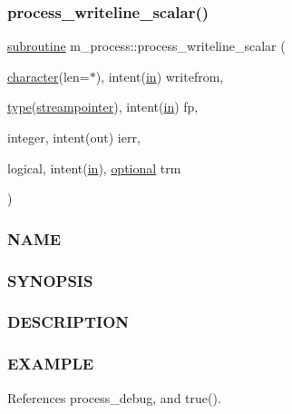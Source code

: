 \subsubsection{\texorpdfstring{process\+\_\+writeline\+\_\+scalar()}{process\_writeline\_scalar()}}
{\footnotesize\ttfamily \hyperlink{M__stopwatch_83_8txt_acfbcff50169d691ff02d4a123ed70482}{subroutine} m\+\_\+process\+::process\+\_\+writeline\+\_\+scalar (\begin{DoxyParamCaption}\item[{\hyperlink{option__stopwatch_83_8txt_abd4b21fbbd175834027b5224bfe97e66}{character}(len=$\ast$), intent(\hyperlink{M__journal_83_8txt_afce72651d1eed785a2132bee863b2f38}{in})}]{writefrom,  }\item[{\hyperlink{stop__watch_83_8txt_a70f0ead91c32e25323c03265aa302c1c}{type}(\hyperlink{structm__process_1_1streampointer}{streampointer}), intent(\hyperlink{M__journal_83_8txt_afce72651d1eed785a2132bee863b2f38}{in})}]{fp,  }\item[{integer, intent(out)}]{ierr,  }\item[{logical, intent(\hyperlink{M__journal_83_8txt_afce72651d1eed785a2132bee863b2f38}{in}), \hyperlink{option__stopwatch_83_8txt_aa4ece75e7acf58a4843f70fe18c3ade5}{optional}}]{trm }\end{DoxyParamCaption})\hspace{0.3cm}{\ttfamily [private]}}



\subsubsection*{N\+A\+ME}

\subsubsection*{S\+Y\+N\+O\+P\+S\+IS}

\subsubsection*{D\+E\+S\+C\+R\+I\+P\+T\+I\+ON}

\subsubsection*{E\+X\+A\+M\+P\+LE}

References process\+\_\+debug, and true().

